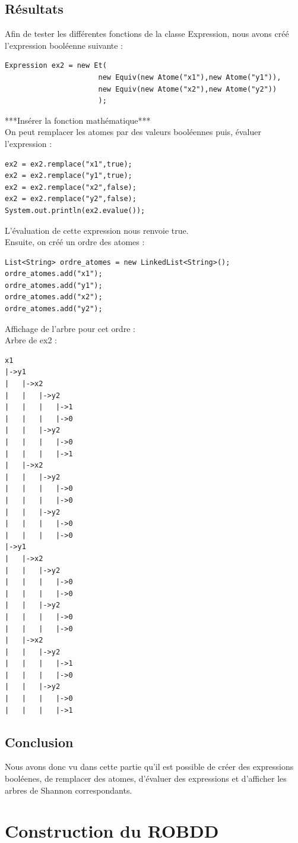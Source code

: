 \documentclass{article}
\begin{document}
\subsection{Résultats}
Afin de tester les différentes fonctions de la classe Expression, nous avons créé l'expression booléenne suivante : \\
\begin{verbatim}
Expression ex2 = new Et(
                      new Equiv(new Atome("x1"),new Atome("y1")), 
                      new Equiv(new Atome("x2"),new Atome("y2"))
                      );
\end{verbatim}
***Insérer la fonction mathématique***\\
On peut remplacer les atomes par des valeurs booléennes puis, évaluer l'expression :
\begin{verbatim}
ex2 = ex2.remplace("x1",true);
ex2 = ex2.remplace("y1",true);
ex2 = ex2.remplace("x2",false);
ex2 = ex2.remplace("y2",false);
System.out.println(ex2.evalue());
\end{verbatim}
L'évaluation de cette expression nous renvoie true.\\
Ensuite, on créé un ordre des atomes :
\begin{verbatim}
List<String> ordre_atomes = new LinkedList<String>();
ordre_atomes.add("x1");
ordre_atomes.add("y1");
ordre_atomes.add("x2");
ordre_atomes.add("y2");
\end{verbatim}
Affichage de l'arbre pour cet ordre : \\
Arbre de ex2 : \\
\begin{verbatim}
x1
|->y1
|   |->x2
|   |   |->y2
|   |   |   |->1
|   |   |   |->0
|   |   |->y2
|   |   |   |->0
|   |   |   |->1
|   |->x2
|   |   |->y2
|   |   |   |->0
|   |   |   |->0
|   |   |->y2
|   |   |   |->0
|   |   |   |->0
|->y1
|   |->x2
|   |   |->y2
|   |   |   |->0
|   |   |   |->0
|   |   |->y2
|   |   |   |->0
|   |   |   |->0
|   |->x2
|   |   |->y2
|   |   |   |->1
|   |   |   |->0
|   |   |->y2
|   |   |   |->0
|   |   |   |->1
\end{verbatim}
\subsection{Conclusion}
Nous avons donc vu dans cette partie qu'il est possible de créer des expressions booléenes, de remplacer des atomes, d'évaluer des expressions et d'afficher les arbres de Shannon correspondants. 
\section{Construction du ROBDD}
\end{document}
